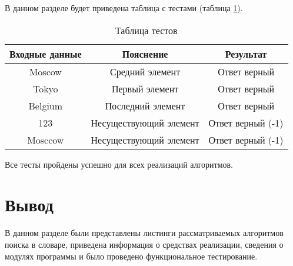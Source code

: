 В данном разделе будет приведена таблица с тестами (таблица \ref{table:ref1}).
\begin{center}
	\captionsetup{justification=raggedleft,singlelinecheck=off}
\begin{table}[ht]
	\centering
	\caption{Таблица тестов}
	\label{table:ref1}
	\begin{tabular}{ |c|c|c|}
		\hline
		Входные данные    & Пояснение   	  & Результат    \\ \hline
		\hline
		Moscow			  & Средний элемент   & Ответ верный \\ \hline
		Tokyo 			  & Первый элемент    & Ответ верный \\ \hline
		Belgium 		  & Последний элемент & Ответ верный \\ \hline
		123 & Несуществующий элемент & Ответ верный (-1) \\ \hline
		Mosccow & Несуществующий элемент & Ответ верный (-1) \\ \hline
	\end{tabular}
\end{table}
\end{center}
Все тесты пройдены успешно для всех реализаций алгоритмов.


\section{Вывод}
В данном разделе были представлены листинги рассматриваемых алгоритмов поиска в словаре, приведена информация о средствах реализации, сведения о модулях программы и было проведено функциональное тестирование.
